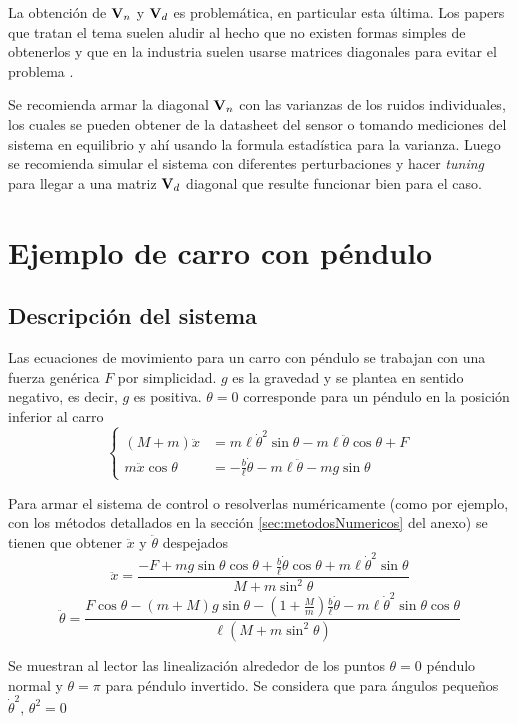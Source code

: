 La obtención de $\mathbf{V}_{{n}}$ y $\mathbf{V}_{{d}}$ es problemática, en particular esta última. Los papers que tratan el tema suelen aludir al hecho que no existen formas simples de obtenerlos y que en la industria suelen usarse matrices diagonales para evitar el problema \cite{formentin2014insight}.

Se recomienda armar la diagonal $\mathbf{V}_{{n}}$ con las varianzas de los ruidos individuales, los cuales se pueden obtener de la datasheet del sensor o tomando mediciones del sistema en equilibrio y ahí usando la formula estadística para la varianza. Luego se recomienda simular el sistema con diferentes perturbaciones y hacer \textit{tuning} para llegar a una matriz $\mathbf{V}_{{d}}$ diagonal que resulte funcionar bien para el caso. 

\section{Ejemplo de carro con péndulo}
\subsection{Descripción del sistema}
Las ecuaciones de movimiento para un carro con péndulo se trabajan con una fuerza genérica $F$ por simplicidad. $g$ es la gravedad y se plantea en sentido negativo, es decir, $g$ es positiva. $\theta=0$ corresponde para un péndulo en la posición inferior al carro
\[
\begin{cases}
(M+m) \ddot{x} &=m \ell \dot{\theta}^{2} \sin \theta-m \ell \ddot{\theta}\cos \theta+F\\
 m \ddot{x} \cos \theta &= -\frac{b}{\ell} \dot{\theta} -m \ell \ddot{\theta} - m g \sin \theta
\end{cases}
\]


Para armar el sistema de control o resolverlas numéricamente (como por ejemplo, con los métodos detallados en la sección \ref{sec:metodosNumericos} del anexo) se tienen que obtener $\ddot{x}$ y $\ddot{\theta}$ despejados
\[
\ddot{x}=\frac{-F +m g \sin \theta \cos \theta+\frac{b}{\ell} \dot{\theta} \cos \theta + m \ell \dot{\theta}^2 \sin \theta}{M+m \sin ^{2} \theta}
\]
\[
\ddot{\theta}=\frac{F\cos \theta -(m+M) g \sin \theta-(1+\frac{M}{m})\frac{b}{\ell} \dot{\theta} - m \ell \dot{\theta}^{ 2} \sin \theta \cos \theta}{\ell\left(M+m \sin ^{2} \theta\right)}
\]

Se muestran al lector las linealización alrededor de los puntos $\theta = 0$ péndulo normal y $\theta = \pi$ para péndulo invertido. Se considera que para ángulos pequeños $\dot{\theta}^2,\,\theta^2 = 0$

